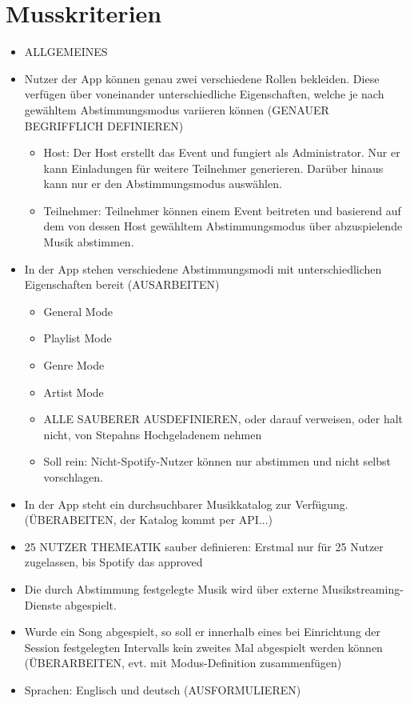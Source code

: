 \documentclass[oneside, ngerman]{sdqtechreport}
\begin{document}
\section{Musskriterien}
\label{sec:Zielbestimmungen:Musskriterien}
\begin{itemize}
    \item ALLGEMEINES
    \item Nutzer der App können genau zwei verschiedene Rollen bekleiden. Diese verfügen über voneinander unterschiedliche Eigenschaften, welche je nach gewähltem Abstimmungsmodus variieren können (GENAUER BEGRIFFLICH DEFINIEREN)
    \begin{itemize}
        \item Host: Der Host erstellt das Event und fungiert als Administrator. Nur er kann Einladungen für weitere Teilnehmer generieren. Darüber hinaus kann nur er den Abstimmungsmodus auswählen.
        \item Teilnehmer: Teilnehmer können einem Event beitreten und basierend auf dem von dessen Host gewähltem Abstimmungsmodus über abzuspielende Musik abstimmen.
    \end{itemize}
    \item In der App stehen verschiedene Abstimmungsmodi mit unterschiedlichen Eigenschaften bereit (AUSARBEITEN)
    \begin{itemize}
        \item General Mode
        \item Playlist Mode
        \item Genre Mode
        \item Artist Mode
        \item ALLE SAUBERER AUSDEFINIEREN, oder darauf verweisen, oder halt nicht, von Stepahns Hochgeladenem nehmen
        \item Soll rein: Nicht-Spotify-Nutzer können nur abstimmen und nicht selbst vorschlagen.
    \end{itemize}
    \item In der App steht ein durchsuchbarer Musikkatalog zur Verfügung. (ÜBERABEITEN, der Katalog kommt per API...)
    \item 25 NUTZER THEMEATIK sauber definieren: Erstmal nur für 25 Nutzer zugelassen, bis Spotify das approved
    \item Die durch Abstimmung festgelegte Musik wird über externe Musikstreaming-Dienste abgespielt.
    \item Wurde ein Song abgespielt, so soll er innerhalb eines bei Einrichtung der Session festgelegten Intervalls kein zweites Mal abgespielt werden können (ÜBERARBEITEN, evt. mit Modus-Definition zusammenfügen)
    \item Sprachen: Englisch und deutsch (AUSFORMULIEREN)

\end{itemize}
\end{document}
